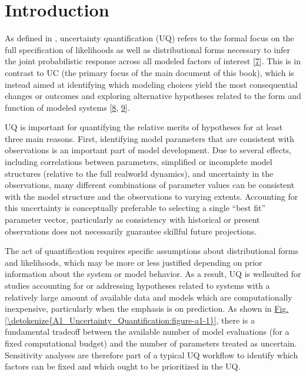 \documentclass[letterpaper,10pt,english]{sphinxmanual}
\begin{document}
\section{Introduction}
\label{\detokenize{A1_Uncertainty_Quantification:introduction}}
\sphinxAtStartPar
As defined in , uncertainty quantification (UQ) refers to the formal focus on the full specification of likelihoods as well as distributional forms necessary to infer the joint  probabilistic response across all modeled factors of interest {[}\hyperlink{cite.index:id11}{7}{]}. This is in contrast to UC (the primary focus of the main document of this book), which is instead aimed at identifying which modeling choices yield the most consequential changes or outcomes and exploring alternative hypotheses related to the form and function of modeled systems {[}\hyperlink{cite.index:id12}{8}, \hyperlink{cite.index:id13}{9}{]}.

\sphinxAtStartPar
UQ is important for quantifying the relative merits of hypotheses for at least three main reasons. First, identifying model parameters that are consistent with observations is an important part of model development. Due to several effects, including correlations between parameters, simplified or incomplete model structures (relative to the full real\sphinxhyphen{}world dynamics), and uncertainty in the observations, many different combinations of parameter values can be consistent with the model structure and the observations to varying extents. Accounting for this uncertainty is conceptually preferable to selecting a single “best fit” parameter vector, particularly as consistency with historical or present observations does not necessarily  guarantee skillful future projections.

\sphinxAtStartPar
The act of quantification requires specific assumptions about distributional forms and likelihoods, which may be more or less justified depending on prior information about the system or model behavior. As a result, UQ is well\sphinxhyphen{}suited for studies accounting for or addressing hypotheses related to systems with a relatively large amount of available data and models which are computationally inexpensive, particularly when the emphasis is on prediction. As shown in \hyperref[\detokenize{A1_Uncertainty_Quantification:figure-a1-1}]{Fig.\@ \ref{\detokenize{A1_Uncertainty_Quantification:figure-a1-1}}}, there is a fundamental tradeoff between the available number of model evaluations (for a fixed computational budget) and the number of parameters treated as uncertain. Sensitivity analyses are therefore part of a typical UQ workflow to identify which factors can be fixed and which ought to be prioritized in the UQ.
\end{document}
